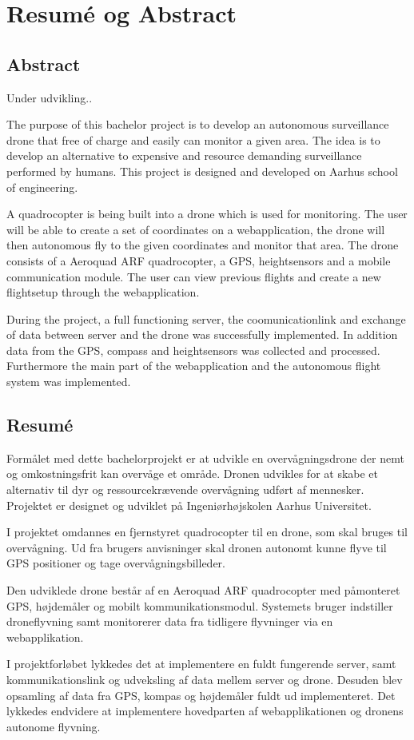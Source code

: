 \chapter{Resumé og Abstract}
\label{chap:resume}


\section*{Abstract}

Under udvikling..


The purpose of this bachelor project is to develop an autonomous surveillance drone that free of charge and easily can monitor a given area. The idea is to develop an alternative to expensive and resource demanding surveillance performed by humans. This project is designed and developed on Aarhus school of engineering. 

A quadrocopter is being built into a drone which is used for monitoring. The user will be able to create a set of coordinates on a webapplication, the drone will then autonomous fly to the given coordinates and monitor that area. 
The drone consists of a Aeroquad ARF quadrocopter, a GPS, heightsensors and a mobile communication module. 
The user can view previous flights and create a new flightsetup through the webapplication.

During the project, a full functioning server, the coomunicationlink and exchange of data between server and the drone was successfully implemented. In addition data from the GPS, compass and heightsensors was collected and processed. Furthermore the main part of the webapplication and the autonomous flight system was implemented.




\section*{Resumé}

Formålet med dette bachelorprojekt er at udvikle en overvågningsdrone der nemt og omkostningsfrit kan overvåge et område. Dronen udvikles for at skabe et alternativ til dyr og ressourcekrævende overvågning udført af mennesker.
Projektet er designet og udviklet på Ingeniørhøjskolen Aarhus Universitet.

I projektet omdannes en fjernstyret quadrocopter til en drone, som skal bruges til overvågning. Ud fra brugers anvisninger skal dronen autonomt kunne flyve til GPS positioner og tage overvågningsbilleder.  

Den udviklede drone består af en Aeroquad ARF quadrocopter med påmonteret GPS, højdemåler og mobilt kommunikationsmodul. Systemets bruger indstiller droneflyvning samt monitorerer data fra tidligere flyvninger via en webapplikation.  

I projektforløbet lykkedes det at implementere en fuldt fungerende server, samt kommunikationslink og udveksling af data mellem server og drone. Desuden blev opsamling af data fra GPS, kompas og højdemåler fuldt ud implementeret. Det lykkedes endvidere at implementere hovedparten af webapplikationen og dronens autonome flyvning.





